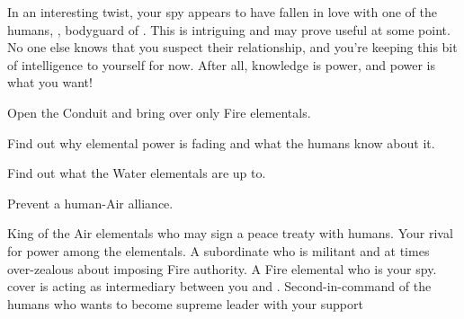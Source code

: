 \documentclass[char]{elementals}
\begin{document}
In an interesting twist, your spy \cJuliet{} appears to have fallen in love with one of the humans, \cRomeo{\intro}, bodyguard of \cLeader{}.  This is intriguing and may prove useful at some point.  No one else knows that you suspect their relationship, and you're keeping this bit of intelligence to yourself for now.  After all, knowledge is power, and power is what you want!




\begin{itemz}[Goals]
  \item Open the Conduit and bring over only Fire elementals.
  \item Find out why elemental power is fading and what the humans know about it.
  \item Find out what the Water elementals are up to.
  \item Prevent a human-Air alliance.
\end{itemz}

\begin{contacts}
  \contact{\cKing{}} King of the Air elementals who may sign a peace treaty with humans.  Your rival for power among the elementals.
  \contact{\cPyro{}} A subordinate who is militant and at times over-zealous about imposing Fire authority.
  \contact{\cJuliet{}} A Fire elemental who is your spy.  \cJuliet{\Their} cover is acting as intermediary between you and \cKing{}.
  \contact{\cDema{}} Second-in-command of the humans who wants to become supreme leader with your support
\end{contacts}
\end{document}
